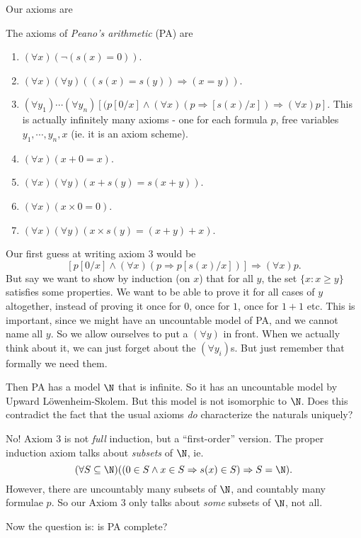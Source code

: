 \documentclass[a4paper]{article}
\begin{document}
Our axioms are
\begin{defi}
  The axioms of \emph{Peano's arithmetic} (PA) are
  \begin{enumerate}
    \item $(\forall x)(\neg(s(x) = 0))$.
    \item $(\forall x)(\forall y)((s(x) = s(y)) \Rightarrow (x = y))$.
    \item $(\forall y_1)\cdots (\forall y_n)[(p[0/x] \wedge (\forall x)(p \Rightarrow [s(x)/x])\Rightarrow (\forall x)p]$. This is actually infinitely many axioms - one for each formula $p$, free variables $y_1, \cdots, y_n, x$ (ie. it is an axiom scheme).
    \item $(\forall x)(x + 0 = x)$.
    \item $(\forall x)(\forall y)(x + s(y) = s(x + y))$.
    \item $(\forall x)(x \times 0 = 0)$.
    \item $(\forall x)(\forall y)(x\times s(y) = (x + y) + x)$.
  \end{enumerate}
  \note Our first guess at writing axiom 3 would be 
  \[
    [p[0/x] \wedge (\forall x)(p\Rightarrow p[s(x)/x])] \Rightarrow (\forall x)p.
  \]
  But say we want to show by induction (on $x$) that for all $y$, the set $\{x: x\geq  y\}$ satisfies some properties. We want to be able to prove it for all cases of $y$ altogether, instead of proving it once for $0$, once for $1$, once for $1 + 1$ etc. This is important, since we might have an uncountable model of PA, and we cannot name all $y$. So we allow ourselves to put a $(\forall y)$ in front. When we actually think about it, we can just forget about the $(\forall y_i)$s. But just remember that formally we need them.
\end{defi}
Then PA has a model $\N$ that is infinite. So it has an uncountable model by Upward L\"owenheim-Skolem. But this model is not isomorphic to $\N$. Does this contradict the fact that the usual axioms \emph{do} characterize the naturals uniquely?

No! Axiom 3 is not \emph{full} induction, but a ``first-order'' version. The proper induction axiom talks about \emph{subsets} of $\N$, ie. 
\[
  (\forall S\subseteq \N )((0 \in S \wedge x\in S \Rightarrow  s(x)\in S)\Rightarrow S=\N).
\]
However, there are uncountably many subsets of $\N$, and countably many formulae $p$. So our Axiom 3 only talks about \emph{some} subsets of $\N$, not all.

Now the question is: is PA complete?
\end{document}
